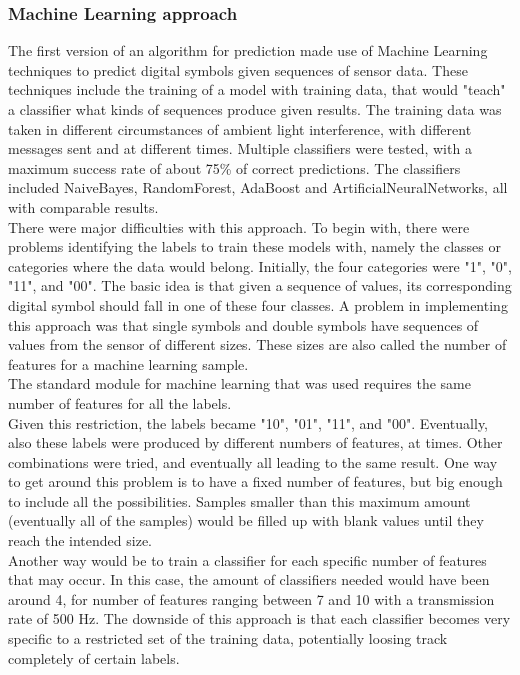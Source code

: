\subsubsection{Machine Learning approach}
The first version of an algorithm for prediction made use of Machine Learning techniques to predict digital symbols given sequences of sensor data.
These techniques include the training of a model with training data, that would "teach" a classifier what kinds of sequences produce given results.
 The training data was taken in different circumstances of ambient light interference, with different messages sent and at different times.
Multiple classifiers were tested, with a maximum success rate of about 75\% of correct predictions. 
The classifiers included NaiveBayes, RandomForest, AdaBoost and ArtificialNeuralNetworks, all with comparable results.\\
There were major difficulties with this approach. 
To begin with, there were problems identifying the labels to train these models with, namely the classes or categories where the data would belong.
Initially, the four categories were "1", "0", "11", and "00". The basic idea is that given a sequence of values, its corresponding digital symbol should fall in one of these four classes.
A problem in implementing this approach was that single symbols and double symbols have sequences of values from the sensor of different sizes. 
These sizes are also called the number of features for a machine learning sample.\\
The standard module for machine learning that was used requires the same number of features for all the labels.\\
Given this restriction, the labels became "10", "01", "11", and "00". Eventually, also these labels were produced by different numbers of features, at times. Other combinations were tried, and eventually all leading to the same result. 
One way to get around this problem is to have a fixed number of features, but big enough to include all the possibilities. 
Samples smaller than this maximum amount (eventually all of the samples) would be filled up with blank values until they reach the intended size.\\
Another way would be to train a classifier for each specific number of features that may occur. In this case, the amount of classifiers needed would have been around 4, for number of features ranging between 7 and 10 with a transmission rate of 500 Hz.
The downside of this approach is that each classifier becomes very specific to a restricted set of the training data, potentially loosing track completely of certain labels.\\
